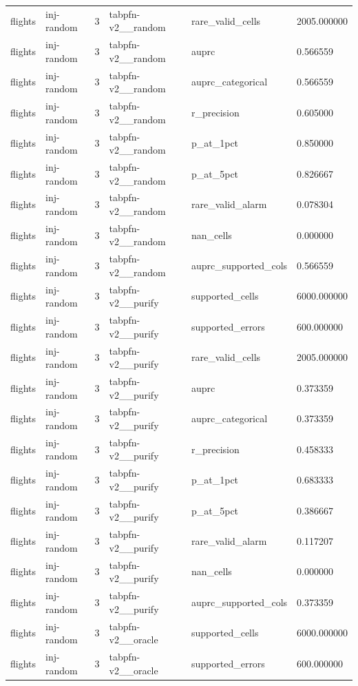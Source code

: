 \begin{tabular}{llllll}
flights & inj-random & 3 & tabpfn-v2\_\_random & rare\_valid\_cells & 2005.000000 \\
flights & inj-random & 3 & tabpfn-v2\_\_random & auprc & 0.566559 \\
flights & inj-random & 3 & tabpfn-v2\_\_random & auprc\_categorical & 0.566559 \\
flights & inj-random & 3 & tabpfn-v2\_\_random & r\_precision & 0.605000 \\
flights & inj-random & 3 & tabpfn-v2\_\_random & p\_at\_1pct & 0.850000 \\
flights & inj-random & 3 & tabpfn-v2\_\_random & p\_at\_5pct & 0.826667 \\
flights & inj-random & 3 & tabpfn-v2\_\_random & rare\_valid\_alarm & 0.078304 \\
flights & inj-random & 3 & tabpfn-v2\_\_random & nan\_cells & 0.000000 \\
flights & inj-random & 3 & tabpfn-v2\_\_random & auprc\_supported\_cols & 0.566559 \\
flights & inj-random & 3 & tabpfn-v2\_\_purify & supported\_cells & 6000.000000 \\
flights & inj-random & 3 & tabpfn-v2\_\_purify & supported\_errors & 600.000000 \\
flights & inj-random & 3 & tabpfn-v2\_\_purify & rare\_valid\_cells & 2005.000000 \\
flights & inj-random & 3 & tabpfn-v2\_\_purify & auprc & 0.373359 \\
flights & inj-random & 3 & tabpfn-v2\_\_purify & auprc\_categorical & 0.373359 \\
flights & inj-random & 3 & tabpfn-v2\_\_purify & r\_precision & 0.458333 \\
flights & inj-random & 3 & tabpfn-v2\_\_purify & p\_at\_1pct & 0.683333 \\
flights & inj-random & 3 & tabpfn-v2\_\_purify & p\_at\_5pct & 0.386667 \\
flights & inj-random & 3 & tabpfn-v2\_\_purify & rare\_valid\_alarm & 0.117207 \\
flights & inj-random & 3 & tabpfn-v2\_\_purify & nan\_cells & 0.000000 \\
flights & inj-random & 3 & tabpfn-v2\_\_purify & auprc\_supported\_cols & 0.373359 \\
flights & inj-random & 3 & tabpfn-v2\_\_oracle & supported\_cells & 6000.000000 \\
flights & inj-random & 3 & tabpfn-v2\_\_oracle & supported\_errors & 600.000000 \\

\end{tabular}

